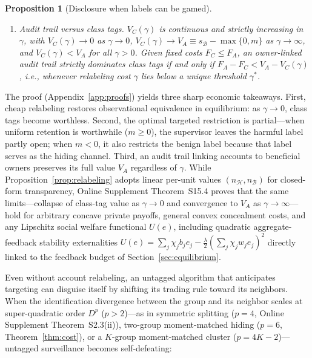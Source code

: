 \documentclass[11pt,letterpaper]{article}
\newtheorem{proposition}[theorem]{Proposition}
\theoremstyle{definition}
\begin{document}
\begin{proposition}[Disclosure when labels can be gamed]
\begin{enumerate}
\begin{itemize}
  \end{itemize}
  In every case, the equilibrium hiding share lies strictly in $(0, 1)$, and at interior optima it is independent of $\gamma$: $z^* = \alpha_{\mathcal{H}}/(2\alpha_{\mathcal{H}} + b_{\mathcal{H}})$ when $m \ge 0$ and $z^* = s_{\mathcal{B}}/\{\chi(2\alpha_{\mathcal{H}} + b_{\mathcal{H}})\}$ when $m < 0$.
  \item[(iii)] \emph{Audit trail versus class tags.} $V_C(\gamma)$ is continuous and strictly increasing in $\gamma$, with $V_C(\gamma) \to 0$ as $\gamma \to 0$, $V_C(\gamma) \to V_A \equiv s_{\mathcal{B}} - \max\{0, m\}$ as $\gamma \to \infty$, and $V_C(\gamma) < V_A$ for all $\gamma > 0$. Given fixed costs $F_C \le F_A$, an owner-linked audit trail strictly dominates class tags if and only if $F_A - F_C < V_A - V_C(\gamma)$, i.e., whenever relabeling cost $\gamma$ lies below a unique threshold $\gamma^*$.
\end{enumerate}
\end{proposition}

The proof (Appendix~\ref{app:proofs}) yields three sharp economic takeaways. First, cheap relabeling restores observational equivalence in equilibrium: as $\gamma \to 0$, class tags become worthless. Second, the optimal targeted restriction is partial—when uniform retention is worthwhile ($m \ge 0$), the supervisor leaves the harmful label partly open; when $m < 0$, it also restricts the benign label because that label serves as the hiding channel. Third, an audit trail linking accounts to beneficial owners preserves its full value $V_A$ regardless of $\gamma$. While Proposition~\ref{prop:relabeling} adopts linear per-unit values $(n_{\mathcal{H}}, n_{\mathcal{B}})$ for closed-form transparency, Online Supplement Theorem~S15.4 proves that the same limits—collapse of class-tag value as $\gamma \to 0$ and convergence to $V_A$ as $\gamma \to \infty$—hold for arbitrary concave private payoffs, general convex concealment costs, and any Lipschitz social welfare functional $U(e)$, including quadratic aggregate-feedback stability externalities $U(e) = \sum_j \chi_j b_j e_j - \frac{\lambda}{2}(\sum_j \chi_j w_j e_j)^2$ directly linked to the feedback budget of Section~\ref{sec:equilibrium}.

Even without account relabeling, an untagged algorithm that anticipates targeting can disguise itself by shifting its trading rule toward its neighbors. When the identification divergence between the group and its neighbor scales at super-quadratic order $D^p$ ($p > 2$)—as in symmetric splitting ($p = 4$, Online Supplement Theorem~S2.3(ii)), two-group moment-matched hiding ($p = 6$, Theorem~\ref{thm:cost}), or a $K$-group moment-matched cluster ($p = 4K - 2$)—untagged surveillance becomes self-defeating:
\end{document}
